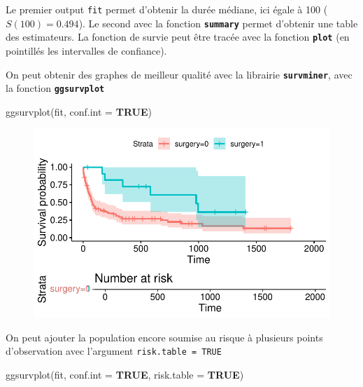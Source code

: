 \documentclass[
  12pt,
  letterpaper,
  DIV=11,
  numbers=noendperiod,
  onepage,
  openany]{scrreprt}
\newenvironment{Shaded}{\begin{snugshade}}{\end{snugshade}}
\newcommand{\AttributeTok}[1]{\textcolor[rgb]{0.80,0.80,0.80}{#1}}
\newcommand{\ConstantTok}[1]{\textcolor[rgb]{0.86,0.64,0.64}{\textbf{#1}}}
\newcommand{\FunctionTok}[1]{\textcolor[rgb]{0.94,0.94,0.56}{#1}}
\newcommand{\NormalTok}[1]{\textcolor[rgb]{0.80,0.80,0.80}{#1}}
\begin{document}
Le premier output \texttt{fit} permet d'obtenir la durée médiane, ici
égale à 100 (\(S(100)=0.494\)). Le second avec la fonction
\textbf{\texttt{summary}} permet d'obtenir une table des estimateurs. La
fonction de survie peut être tracée avec la fonction
\textbf{\texttt{plot}} (en pointillés les intervalles de confiance).

On peut obtenir des graphes de meilleur qualité avec la librairie
\textbf{\texttt{survminer}}, avec la fonction
\textbf{\texttt{ggsurvplot}}

\begin{Shaded}
\begin{Highlighting}[]
\FunctionTok{ggsurvplot}\NormalTok{(fit, }\AttributeTok{conf.int =} \ConstantTok{TRUE}\NormalTok{)}
\end{Highlighting}
\end{Shaded}

\begin{figure}[H]

{\centering \includegraphics{14-R_files/figure-pdf/unnamed-chunk-9-1.pdf}

}

\end{figure}

On peut ajouter la population encore soumise au risque à plusieurs
points d'observation avec l'argument \texttt{risk.table\ =\ TRUE}

\begin{Shaded}
\begin{Highlighting}[]
\FunctionTok{ggsurvplot}\NormalTok{(fit, }\AttributeTok{conf.int =} \ConstantTok{TRUE}\NormalTok{, }\AttributeTok{risk.table =} \ConstantTok{TRUE}\NormalTok{)}
\end{Highlighting}
\end{Shaded}
\end{document}
